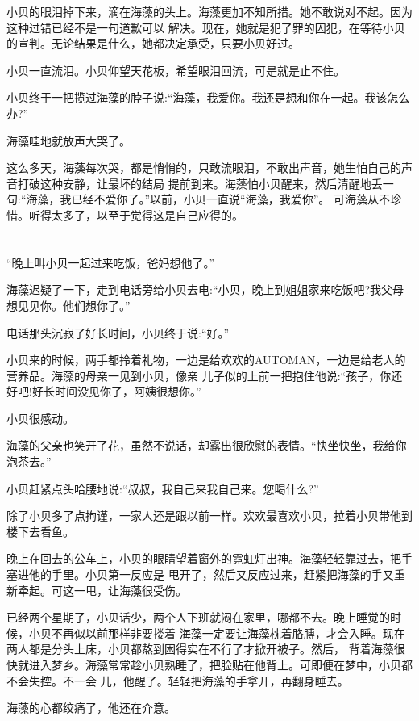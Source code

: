 \documentclass[11pt,a4paper,onecolumn]{article}
\begin{document}
小贝的眼泪掉下来，滴在海藻的头上。海藻更加不知所措。她不敢说对不起。因为这种过错已经不是一句道歉可以
解决。现在，她就是犯了罪的囚犯，在等待小贝的宣判。无论结果是什么，她都决定承受，只要小贝好过。

小贝一直流泪。小贝仰望天花板，希望眼泪回流，可是就是止不住。

小贝终于一把揽过海藻的脖子说:``海藻，我爱你。我还是想和你在一起。我该怎么办?''

海藻哇地就放声大哭了。

这么多天，海藻每次哭，都是悄悄的，只敢流眼泪，不敢出声音，她生怕自己的声音打破这种安静，让最坏的结局
提前到来。海藻怕小贝醒来，然后清醒地丢一句:``海藻，我已经不爱你了。''以前，小贝一直说``海藻，我爱你''。
可海藻从不珍惜。听得太多了，以至于觉得这是自己应得的。

\section[\thesection]{}

``晚上叫小贝一起过来吃饭，爸妈想他了。''

海藻迟疑了一下，走到电话旁给小贝去电:``小贝，晚上到姐姐家来吃饭吧?我父母想见见你。他们想你了。''

电话那头沉寂了好长时间，小贝终于说:``好。''

小贝来的时候，两手都拎着礼物，一边是给欢欢的AUTOMAN，一边是给老人的营养品。海藻的母亲一见到小贝，像亲
儿子似的上前一把抱住他说:``孩子，你还好吧!好长时间没见你了，阿姨很想你。''

小贝很感动。

海藻的父亲也笑开了花，虽然不说话，却露出很欣慰的表情。``快坐快坐，我给你泡茶去。''

小贝赶紧点头哈腰地说:``叔叔，我自己来我自己来。您喝什么?''

除了小贝多了点拘谨，一家人还是跟以前一样。欢欢最喜欢小贝，拉着小贝带他到楼下去看鱼。

晚上在回去的公车上，小贝的眼睛望着窗外的霓虹灯出神。海藻轻轻靠过去，把手塞进他的手里。小贝第一反应是
甩开了，然后又反应过来，赶紧把海藻的手又重新牵起。可这一甩，让海藻很受伤。

已经两个星期了，小贝话少，两个人下班就闷在家里，哪都不去。晚上睡觉的时候，小贝不再似以前那样非要搂着
海藻一定要让海藻枕着胳膊，才会入睡。现在两人都是分头上床，小贝都熬到困得实在不行了才掀开被子。然后，
背着海藻很快就进入梦乡。海藻常常趁小贝熟睡了，把脸贴在他背上。可即便在梦中，小贝都不会失控。不一会
儿，他醒了。轻轻把海藻的手拿开，再翻身睡去。

海藻的心都绞痛了，他还在介意。
\end{document}
